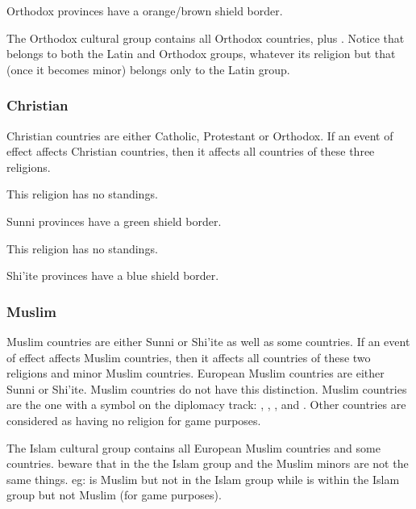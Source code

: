 \aparag Orthodox provinces have a orange/brown shield border.

\aparag The Orthodox cultural group contains all Orthodox countries, plus
\POL.
\bparag Notice that \POL belongs to both the Latin and Orthodox groups,
whatever its religion but that \paysPologne (once it becomes minor) belongs
only to the Latin group.


\subsubsection{Christian}
\aparag Christian countries are either Catholic, Protestant or Orthodox.
\bparag If an event of effect affects Christian countries, then it affects all
countries of these three religions.

\aparag This religion has no standings.

\aparag Sunni provinces have a green shield border.

\aparag This religion has no standings.

\aparag Shi'ite provinces have a blue shield border.


\subsubsection{Muslim}
\aparag Muslim countries are either Sunni or Shi'ite as well as some \ROTW
countries.
\bparag If an event of effect affects Muslim countries, then it affects all
countries of these two religions and \ROTW minor Muslim countries.
\bparag European Muslim countries are either Sunni or Shi'ite. \ROTW Muslim
countries do not have this distinction.
\bparag \ROTW Muslim countries are the one with a \Xsunnite symbol on the
\ROTW diplomacy track: \paysAden, \paysOman, \paysSoudan, \paysGujerat and
. Other \ROTW countries are considered as having no religion for
game purposes.

\aparag The Islam cultural group contains all European Muslim countries and
some \ROTW countries.
\bparag beware that in the \ROTW the Islam group and the Muslim minors are not
the same things. eg: \paysGujerat is Muslim but not in the Islam group while
\paysMogol is within the Islam group but not Muslim (for game purposes).

